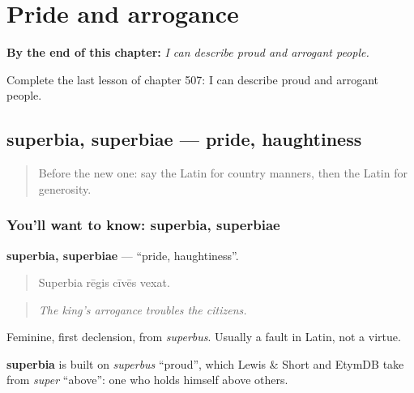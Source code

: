 
\chapter{Pride and arrogance}
\label{ch:la-pride-and-arrogance}

\begin{chapteropening}
\textbf{By the end of this chapter:} \emph{I can describe proud and arrogant people.}

Complete the last lesson of chapter 507: I can describe proud and arrogant people.
\end{chapteropening}

\section[superbia, superbiae]{superbia, superbiae — pride, haughtiness}

\label{lesson:LA-C507-superbia}



\begin{quote}
Before the new one: say the Latin for country manners, then the Latin for generosity.
\end{quote}

\subsection*{You'll want to know: superbia, superbiae}
\textbf{superbia, superbiae} — \textquotedblleft{}pride, haughtiness\textquotedblright{}.

\begin{quote}
Superbia rēgis cīvēs vexat.
\end{quote}

\begin{quote}
\emph{The king's arrogance troubles the citizens.}
\end{quote}

Feminine, first declension, from \emph{superbus}. Usually a fault in Latin, not a virtue.

\begin{cousinweb}
\textbf{superbia} is built on \emph{superbus} \textquotedblleft{}proud\textquotedblright{}, which Lewis \& Short and EtymDB take from \emph{super} \textquotedblleft{}above\textquotedblright{}: one who holds himself above others.
\end{cousinweb}

